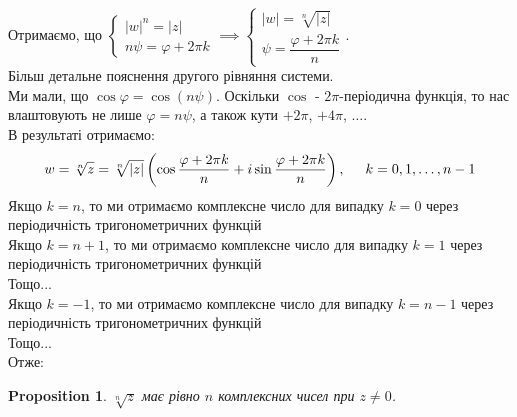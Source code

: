 \documentclass[a4paper, 10pt]{article}
\theoremstyle{theoremdd}
\theoremstyle{theoremdd}
\theoremstyle{theoremdd}
\theoremstyle{theoremdd}
\theoremstyle{theoremdd}
\newtheorem{proposition}[theorem]{Proposition}
\theoremstyle{theoremdd}
\theoremstyle{theoremdd}
\theoremstyle{theoremdd}
\begin{document}
Отримаємо, що $\begin{cases} |w|^n = |z| \\ n \psi = \varphi + 2 \pi k \end{cases} \implies \begin{cases} |w| = \sqrt[n]{|z|} \\ \psi = \dfrac{\varphi + 2\pi k}{n} \end{cases}$.\\
Більш детальне пояснення другого рівняння системи.\\
Ми мали, що $\cos \varphi = \cos (n \psi)$. Оскільки $\cos$ - $2\pi$-періодична функція, то нас влаштовують не лише $\varphi = n \psi$, а також кути $+2\pi$, $+4\pi$, $\dots$.\\
В результаті отримаємо:
$$w = \sqrt[n]{z} = \sqrt[n]{|z|} \left(\cos \dfrac{\varphi + 2\pi k}{n} + i \sin \dfrac{\varphi + 2 \pi k}{n} \right), \hspace{0.5cm} k = 0,1,\dots,n-1$$
Якщо $k = n$, то ми отримаємо комплексне число для випадку $k = 0$ через періодичність тригонометричних функцій\\
Якщо $k = n+1$, то ми отримаємо комплексне число для випадку $k = 1$ через періодичність тригонометричних функцій\\
Тощо...\\
Якщо $k = -1$, то ми отримаємо комплексне число для випадку $k = n-1$ через періодичність тригонометричних функцій\\
Тощо...\\
Отже:

\begin{proposition}
$\sqrt[n]{z}$ має рівно $n$ комплексних чисел при $z \neq 0$.
\end{proposition}
\end{document}
